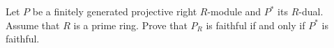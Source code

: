 Let $P$ be a finitely generated projective right $R$-module and $P^*$ its $R$-dual. Assume that $R$ is a prime ring. Prove that $P_R$ is faithful if and only if $P^*$ is faithful.
